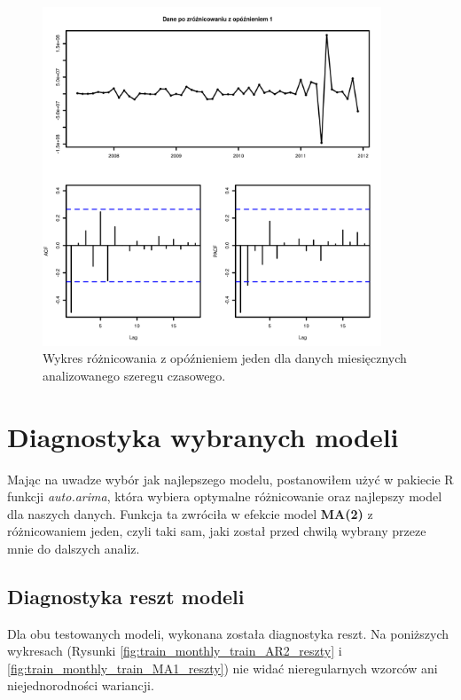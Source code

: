 \documentclass[11pt]{article}
\begin{document}
\begin{figure}[h]
    \centering
	\includegraphics[width=0.9\textwidth]{images/data_monthly_train_roznicowanie_z_opoznieniem_jeden.png}
    \caption{Wykres różnicowania z opóźnieniem jeden dla danych miesięcznych analizowanego szeregu czasowego.}
    \label{fig:data_monthly_train_roznicowanie_z_opoznieniem_jeden}

\end{figure}

\newpage

\section{Diagnostyka wybranych modeli}

Mając na uwadze wybór jak najlepszego modelu, postanowiłem użyć w pakiecie R funkcji \textit{auto.arima}, która wybiera optymalne różnicowanie oraz najlepszy model dla naszych danych. Funkcja ta zwróciła w efekcie model \textbf{MA(2)} z różnicowaniem jeden, czyli taki sam, jaki został przed chwilą wybrany przeze mnie do dalszych analiz.

\subsection{Diagnostyka reszt modeli}

Dla obu testowanych modeli, wykonana została diagnostyka reszt. Na poniższych wykresach (Rysunki \ref{fig:train_monthly_train_AR2_reszty} i \ref{fig:train_monthly_train_MA1_reszty}) nie widać nieregularnych wzorców ani niejednorodności wariancji.
\end{document}
